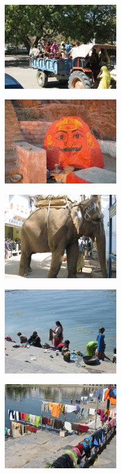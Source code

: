 \begin{multicols}{2}
\smallbreak
\hspace*{-0.65cm}
\includegraphics[width=5cm]{articles/Il-commence-a-faire-chaud/scolaire.jpg}
\smallbreak

\smallbreak
\hspace*{-0.65cm}
\includegraphics[width=5cm]{articles/Il-commence-a-faire-chaud/bonhommerouge.jpg}
\smallbreak

\smallbreak
\hspace*{-0.65cm}
\includegraphics[width=5cm]{articles/Il-commence-a-faire-chaud/elephant.jpg}
\smallbreak

\smallbreak
\hspace*{-0.65cm}
\includegraphics[width=5cm]{articles/Il-commence-a-faire-chaud/linge.jpg}
\smallbreak

\smallbreak
\hspace*{-0.65cm}
\includegraphics[width=5cm]{articles/Il-commence-a-faire-chaud/seche.jpg}
\smallbreak


\end{multicols}
